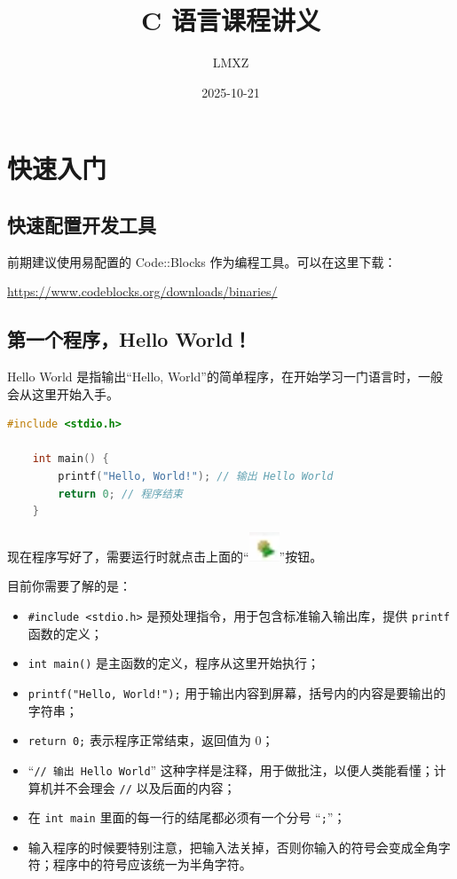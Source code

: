 \documentclass[lang=cn,newtx,10pt,scheme=chinese]{elegantbook}
\title{C 语言课程讲义}
\author{LMXZ}
\date{2025-10-21}
\begin{document}
\maketitle
\frontmatter

\tableofcontents

\mainmatter

\chapter{快速入门}

\section{快速配置开发工具}

前期建议使用易配置的 Code::Blocks 作为编程工具。可以在这里下载：

\href{https://www.codeblocks.org/downloads/binaries/}
{https://www.codeblocks.org/downloads/binaries/}

\section{第一个程序，Hello World！}

Hello World 是指输出“Hello, World”的简单程序，在开始学习一门语言时，一般会从这里开始入手。

\begin{lstlisting}[language=C]
    #include <stdio.h>
    
    int main() {
        printf("Hello, World!"); // 输出 Hello World
        return 0; // 程序结束
    }
\end{lstlisting}        

现在程序写好了，需要运行时就点击上面的“\includegraphics{image/btn_compile_run.png}”按钮。

目前你需要了解的是：

\begin{itemize}
    \item \lstinline{#include <stdio.h>} 是预处理指令，用于包含标准输入输出库，提供 \lstinline{printf} 函数的定义；
    \item \lstinline{int main()} 是主函数的定义，程序从这里开始执行；
    \item \lstinline{printf("Hello, World!");} 用于输出内容到屏幕，括号内的内容是要输出的字符串；
    \item \lstinline{return 0;} 表示程序正常结束，返回值为 0；
    \item “\lstinline{// 输出 Hello World}” 这种字样是注释，用于做批注，以便人类能看懂；计算机并不会理会 \lstinline{//} 以及后面的内容；
    \item 在 \lstinline{int main} 里面的每一行的结尾都必须有一个分号 “\lstinline{;}”；
    \item 输入程序的时候要特别注意，把输入法关掉，否则你输入的符号会变成全角字符；程序中的符号应该统一为半角字符。
\end{itemize}
\end{document}
